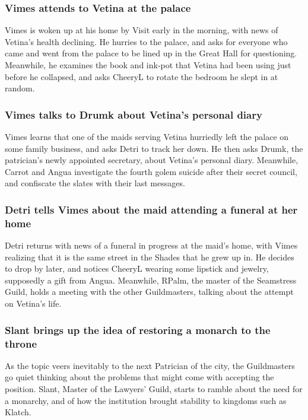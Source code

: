 \subsubsection{\Gls{Vimes} attends to \Gls{Vetina} at the palace}
\Gls{Vimes} is woken up at his home by \Gls{Visit} early in the morning, with news of \Gls{Vetina}'s
health declining. He hurries to the palace, and asks for everyone who came and went from the palace
to be lined up in the Great Hall for questioning. Meanwhile, he examines the book and ink-pot that
\Gls{Vetina} had been using just before he collapsed, and asks \Gls{CheeryL} to rotate the bedroom
he slept in at random.

\subsubsection{\Gls{Vimes} talks to \Gls{Drumk} about \Gls{Vetina}'s personal diary}
\Gls{Vimes} learns that one of the maids serving \Gls{Vetina} hurriedly left the palace on some
family business, and asks \Gls{Detri} to track her down. He then asks \Gls{Drumk}, the patrician's
newly appointed secretary, about \Gls{Vetina}'s personal diary. Meanwhile, \Gls{Carrot} and
\Gls{Angua} investigate the fourth golem suicide after their secret council, and confiscate the
slates with their last messages.

\subsubsection{\Gls{Detri} tells \Gls{Vimes} about the maid attending a funeral at her home}
\Gls{Detri} returns with news of a funeral in progress at the maid's home, with \Gls{Vimes}
realizing that it is the same street in the Shades that he grew up in. He decides to drop by later,
and notices \Gls{CheeryL} wearing some lipstick and jewelry, supposedly a gift from \Gls{Angua}.
Meanwhile, \Gls{RPalm}, the master of the Seamstress Guild, holds a meeting with the other
Guildmasters, talking about the attempt on \Gls{Vetina}'s life.

\subsubsection{\Gls{Slant} brings up the idea of restoring a monarch to the throne}
As the topic veers inevitably to the next Patrician of the city, the Guildmasters go quiet thinking
about the problems that might come with accepting the position. \Gls{Slant}, Master of the Lawyers'
Guild, starts to ramble about the need for a monarchy, and of how the institution brought stability
to kingdoms such as Klatch.


